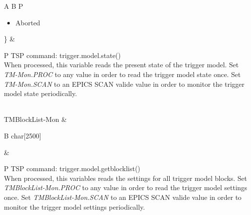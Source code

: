 \documentclass[openany]{article}
\begin{document}
\begin{longtable}{A B P}
\begin{itemize}[noitemsep]
					\item[] Aborted
				\end{itemize}\} & 
				\begin{tabular}{P}
					TSP command: trigger.model.state() \\
					When processed, this variable reads the present state of the trigger model. Set \emph{TM-Mon.PROC} to any value in order to read the trigger model state once. Set \emph{TM-Mon.SCAN} to an EPICS SCAN valide value in order to monitor the trigger model state periodically.
				\end{tabular} \\ \hline
		TMBlockList-Mon & \begin{tabular}{B}
					char[2500]
				\end{tabular} & 
				\begin{tabular}{P}
					TSP command: trigger.model.getblocklist() \\
					When processed, this variables reads the settings for all trigger model blocks. Set \emph{TMBlockList-Mon.PROC} to any value in order to read the trigger model settings once. Set \emph{TMBlockList-Mon.SCAN} to an EPICS SCAN valide value in order to monitor the trigger model settings periodically.
				\end{tabular} \\ \hline
	\end{longtable}
\end{document}
